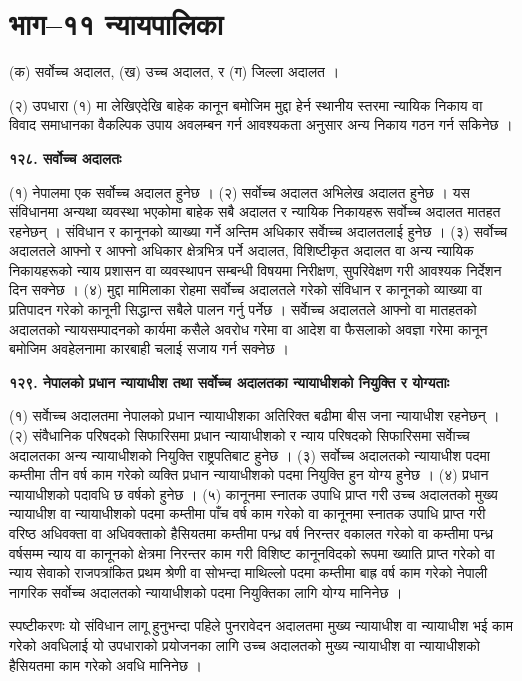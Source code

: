 \section{भाग–११ न्यायपालिका}

(क) सर्वोच्च अदालत,
(ख) उच्च अदालत, र
(ग) जिल्ला अदालत ।

(२) उपधारा (१) मा लेखिएदेखि बाहेक कानून बमोजिम मुद्दा हेर्न स्थानीय स्तरमा न्यायिक निकाय वा विवाद समाधानका वैकल्पिक उपाय
अवलम्बन गर्न आवश्यकता अनुसार अन्य निकाय गठन गर्न सकिनेछ ।

\textbf{१२८. सर्वोच्च अदालतः}

(१) नेपालमा एक सर्वोच्च अदालत हुनेछ ।
(२) सर्वोच्च अदालत अभिलेख अदालत हुनेछ । यस संविधानमा अन्यथा व्यवस्था भएकोमा बाहेक सबै अदालत र न्यायिक निकायहरू सर्वोच्च अदालत मातहत रहनेछन् । संविधान र कानूनको व्याख्या गर्ने अन्तिम अधिकार सर्वाेच्च अदालतलाई हुनेछ ।
(३) सर्वोच्च अदालतले आफ्नो र आफ्नो अधिकार क्षेत्रभित्र पर्ने अदालत, विशिष्टीकृत अदालत वा अन्य न्यायिक निकायहरूको न्याय प्रशासन वा व्यवस्थापन सम्बन्धी विषयमा निरीक्षण, सुपरिवेक्षण गरी आवश्यक निर्देशन दिन सक्नेछ ।
(४) मुद्दा मामिलाका रोहमा सर्वोच्च अदालतले गरेको संविधान र कानूनको व्याख्या वा प्रतिपादन गरेको कानूनी सिद्धान्त सबैले पालन गर्नु पर्नेछ । सर्वाेच्च अदालतले आफ्नो वा मातहतको अदालतको न्यायसम्पादनको कार्यमा कसैले अवरोध गरेमा वा आदेश वा फैसलाको अवज्ञा गरेमा कानून बमोजिम अवहेलनामा कारबाही चलाई सजाय गर्न सक्नेछ ।

\textbf{१२९. नेपालको प्रधान न्यायाधीश तथा सर्वोच्च अदालतका न्यायाधीशको नियुक्ति र योग्यताः}

(१) सर्वाेच्च अदालतमा नेपालको प्रधान न्यायाधीशका अतिरिक्त बढीमा बीस जना न्यायाधीश रहनेछन् ।
(२) संवैधानिक परिषदको सिफारिसमा प्रधान न्यायाधीशको र न्याय परिषदको सिफारिसमा सर्वाेच्च अदालतका अन्य न्यायाधीशको नियुक्ति राष्ट्रपतिबाट हुनेछ ।
(३) सर्वोच्च अदालतको न्यायाधीश पदमा कम्तीमा तीन वर्ष काम गरेको व्यक्ति प्रधान न्यायाधीशको पदमा नियुक्ति हुन योग्य हुनेछ ।
(४) प्रधान न्यायाधीशको पदावधि छ वर्षको हुनेछ ।
(५) कानूनमा स्नातक उपाधि प्राप्त गरी उच्च अदालतको मुख्य न्यायाधीश वा न्यायाधीशको पदमा कम्तीमा पाँच वर्ष काम गरेको वा कानूनमा स्नातक उपाधि प्राप्त गरी वरिष्ठ अधिवक्ता वा अधिवक्ताको हैसियतमा कम्तीमा पन्ध्र वर्ष निरन्तर वकालत गरेको वा कम्तीमा पन्ध्र वर्षसम्म न्याय वा कानूनको क्षेत्रमा निरन्तर काम गरी विशिष्ट कानूनविदको रूपमा ख्याति प्राप्त गरेको वा न्याय सेवाको राजपत्रांकित प्रथम श्रेणी वा सोभन्दा माथिल्लो पदमा कम्तीमा बाह्र वर्ष काम गरेको नेपाली नागरिक सर्वोच्च अदालतको न्यायाधीशको पदमा नियुक्तिका लागि योग्य मानिनेछ ।

स्पष्टीकरणः यो संविधान लागू हुनुभन्दा पहिले पुनरावेदन अदालतमा मुख्य न्यायाधीश वा न्यायाधीश भई काम गरेको अवधिलाई यो उपधाराको प्रयोजनका लागि उच्च अदालतको मुख्य न्यायाधीश वा न्यायाधीशको हैसियतमा काम गरेको अवधि मानिनेछ ।

